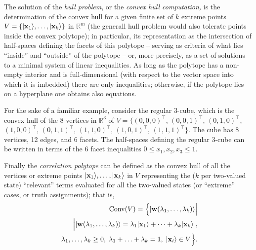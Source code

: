 \documentclass[%
  twocolumn,
 showpacs,
 showkeys,
 preprintnumbers,
 amsmath,amssymb,
 aps,
  pra,
  longbibliography,
 floatfix,
 ]{revtex4-1}
\begin{document}
The solution of the  {\em hull problem}, or the
{\em convex hull computation,}
is the determination of the convex hull for a given finite set of
$k$ extreme points $V = \{ \vert  {\bf x}_1 \rangle  , \ldots , \vert  {\bf x}_k \rangle \}$ in $\mathbb{R}^m$
(the generall hull problem would also tolerate points inside the convex polytope);
in particular, its representation as the intersection of half-spaces defining the facets of this polytope
-- serving as criteria of what lies ``inside'' and ``outside'' of the polytope -- or,
more precisely, as a set of solutions to a minimal system of linear inequalities.
As long as the polytope has a non-empty interior and is full-dimensional
(with respect to the vector space into which it is imbedded)
 there are only inequalities;
otherwise, if the polytope lies on a hyperplane one obtains also equations.


For the sake of a familiar example, consider the regular 3-cube,
which is the convex hull of the 8 vertices in  $\mathbb{R}^3$  of
$V= \big\{
\left(0, 0, 0\right)^\intercal$,   $
\left(0, 0, 1\right)^\intercal$,   $
\left(0, 1, 0\right)^\intercal$,   $
\left(1, 0, 0\right)^\intercal$,   $
\left(0, 1, 1\right)^\intercal$,   $
\left(1, 1, 0\right)^\intercal$,   $
\left(1, 0, 1\right)^\intercal$,   $
\left(1, 1, 1\right)^\intercal
\big\}
$.
The cube has 8 vertices, 12 edges, and 6 facets.
The half-spaces defining the  regular 3-cube can be written in terms of the 6 facet inequalities
$0 \le x_1,x_2,x_3 \le 1$.



Finally the {\em correlation polytope} can be defined
as the convex hull of all the vertices or extreme points
$\vert  {\bf x}_1 \rangle , \ldots , \vert  {\bf x}_k \rangle$
in $V$
representing the ($k$ per two-valued state) ``relevant'' terms  evaluated for all the two-valued states
(or ``extreme'' cases, or truth assignments); that is,
\begin{equation}
\begin{split}
\text{Conv}(V) =\Big\{
\vert {\bf w} ( \lambda_1 ,\ldots , \lambda_k ) \rangle
\Big| \\   \Big|
\vert {\bf w} ( \lambda_1 ,\ldots , \lambda_k ) \rangle
=
\lambda_1 \vert  {\bf x}_1 \rangle  + \cdots + \lambda_k \vert  {\bf x}_k \rangle  \;  ,
\\     \;
\lambda_1, \ldots , \lambda_k  \ge 0 ,
\;
\lambda_1 + \ldots + \lambda_k   = 1   ,
\;
\vert  {\bf x}_i \rangle \in V
\Big\}
.
\label{2017-b-correlationpolytope}
\end{split}
\end{equation}
\end{document}
